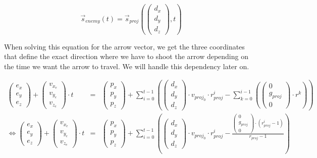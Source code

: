 \begin{equation*}
    \overrightarrow{s}_{enemy}(t) = \overrightarrow{s}_{proj}({\begin{pmatrix} d_x \\ d_y \\ d_z \end{pmatrix}}, t)
\end{equation*}

When solving this equation for the arrow vector, we get the three coordinates that define the exact direction where we have to shoot the arrow depending on the time we want the arrow to travel. We will handle this dependency later on. 

\begin{eqnarray*}
    {\begin{pmatrix} e_x \\ e_y \\ e_z \end{pmatrix}} + {\begin{pmatrix} v_{x_e} \\ v_{y_e} \\ v_{z_e} \end{pmatrix}} \cdot t & = & {\begin{pmatrix} p_x \\ p_y \\ p_z \end{pmatrix}} + \sum_{i=0}^{t-1} ({\begin{pmatrix} d_x \\ d_y \\ d_z \end{pmatrix}} \cdot v_{proj_0} \cdot r_{proj}^i - \sum_{k = 0}^{i - 1}({\begin{pmatrix} 0 \\ g_{proj} \\ 0 \end{pmatrix}} \cdot r^k))
    \\
    \Leftrightarrow {\begin{pmatrix} e_x \\ e_y \\ e_z \end{pmatrix}} + {\begin{pmatrix} v_{x_e} \\ v_{y_e} \\ v_{z_e} \end{pmatrix}} \cdot t & = & {\begin{pmatrix} p_x \\ p_y \\ p_z \end{pmatrix}} + \sum_{i=0}^{t-1} ({\begin{pmatrix} d_x \\ d_y \\ d_z \end{pmatrix}} \cdot v_{proj_0} \cdot r_{proj}^i - \frac{{\begin{pmatrix} 0 \\ g_{proj} \\ 0 \end{pmatrix}} \cdot (r_{proj}^i - 1)}{r_{proj} - 1})
\end{eqnarray*}

